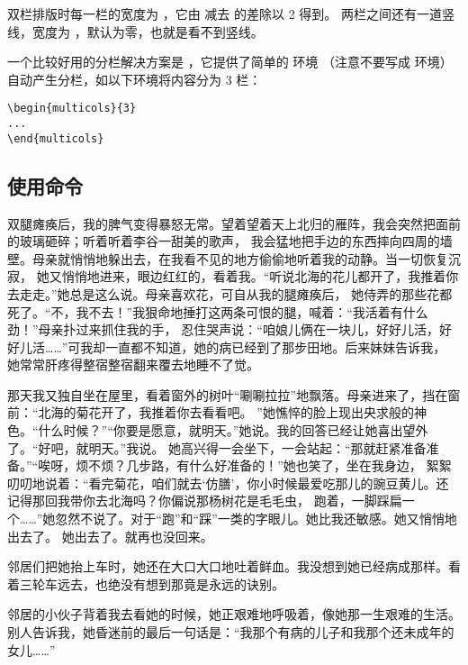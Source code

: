 \documentclass[fontset=windows]{article}
\begin{document}
双栏排版时每一栏的宽度为 ，它由  减去  的差除以 2 得到。
两栏之间还有一道竖线，宽度为 ，默认为零，也就是看不到竖线。

一个比较好用的分栏解决方案是 ，它提供了简单的  环境
（注意不要写成  环境）自动产生分栏，如以下环境将内容分为 3 栏：
\begin{verbatim}
\begin{multicols}{3}
...
\end{multicols}
\end{verbatim}


\subsection{使用命令}
\twocolumn
\columnseprule=0.5pt
双腿瘫痪后，我的脾气变得暴怒无常。望着望着天上北归的雁阵，我会突然把面前的玻璃砸碎；听着听着李谷一甜美的歌声，
我会猛地把手边的东西摔向四周的墙壁。母亲就悄悄地躲出去，在我看不见的地方偷偷地听着我的动静。当一切恢复沉寂，
她又悄悄地进来，眼边红红的，看着我。“听说北海的花儿都开了，我推着你去走走。”她总是这么说。母亲喜欢花，可自从我的腿瘫痪后，
她侍弄的那些花都死了。“不，我不去！”我狠命地捶打这两条可恨的腿，喊着：“我活着有什么劲！”母亲扑过来抓住我的手，
忍住哭声说：“咱娘儿俩在一块儿，好好儿活，好好儿活……”可我却一直都不知道，她的病已经到了那步田地。后来妹妹告诉我，
她常常肝疼得整宿整宿翻来覆去地睡不了觉。

那天我又独自坐在屋里，看着窗外的树叶“唰唰拉拉”地飘落。母亲进来了，挡在窗前：“北海的菊花开了，我推着你去看看吧。
”她憔悴的脸上现出央求般的神色。“什么时候？”“你要是愿意，就明天。”她说。我的回答已经让她喜出望外了。“好吧，就明天。”我说。
她高兴得一会坐下，一会站起：“那就赶紧准备准备。”“唉呀，烦不烦？几步路，有什么好准备的！”她也笑了，坐在我身边，
絮絮叨叨地说着：“看完菊花，咱们就去‘仿膳’，你小时候最爱吃那儿的豌豆黄儿。还记得那回我带你去北海吗？你偏说那杨树花是毛毛虫，
跑着，一脚踩扁一个……”她忽然不说了。对于“跑”和“踩”一类的字眼儿。她比我还敏感。她又悄悄地出去了。
\newpage 
她出去了。就再也没回来。

邻居们把她抬上车时，她还在大口大口地吐着鲜血。我没想到她已经病成那样。看着三轮车远去，也绝没有想到那竟是永远的诀别。

邻居的小伙子背着我去看她的时候，她正艰难地呼吸着，像她那一生艰难的生活。别人告诉我，她昏迷前的最后一句话是：“我那个有病的儿子和我那个还未成年的女儿……”
\end{document}
